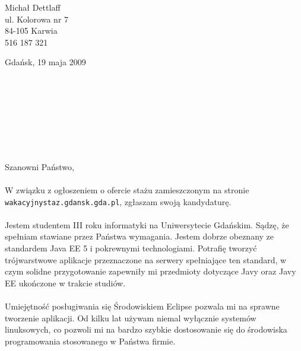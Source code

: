 \documentclass[letterpaper]{article}
\def\name{Michał Dettlaff}
\begin{document}


\vspace{0.25in}

\begin{minipage}{0.65\linewidth}
  Michał Dettlaff \\
  ul. Kolorowa nr 7 \\
  84-105 Karwia \\
  516 187 321
\end{minipage}
\begin{minipage}{0.25\linewidth}
  Gdańsk, 19 maja 2009 \\
  \\
  \\
  \\
  \\
  \\
  \\
  \\
\end{minipage}

\paragraph{}
\noindent Szanowni Państwo,

\paragraph{}
\noindent W związku z ogłoszeniem o ofercie stażu zamieszczonym na stronie {\tt wakacyjnystaz.gdansk.gda.pl}, zgłaszam swoją kandydaturę.

\paragraph{}
\noindent Jestem studentem III roku informatyki na Uniwersytecie Gdańskim. Sądzę, że spełniam stawiane przez Państwa wymagania. Jestem dobrze obeznany ze standardem Java EE 5 i pokrewnymi technologiami. Potrafię tworzyć trójwarstwowe aplikacje przeznaczone na serwery spełniające ten standard, w czym solidne przygotowanie zapewniły mi przedmioty dotyczące Javy oraz Javy EE ukończone w trakcie studiów.

\paragraph{}
\noindent Umiejętność posługiwania się Środowiskiem Eclipse pozwala mi na sprawne tworzenie aplikacji. Od kilku lat używam niemal wyłącznie systemów linuksowych, co pozwoli mi na bardzo szybkie dostosowanie się do środowiska programowania stosowanego w Państwa firmie.
\end{document}
